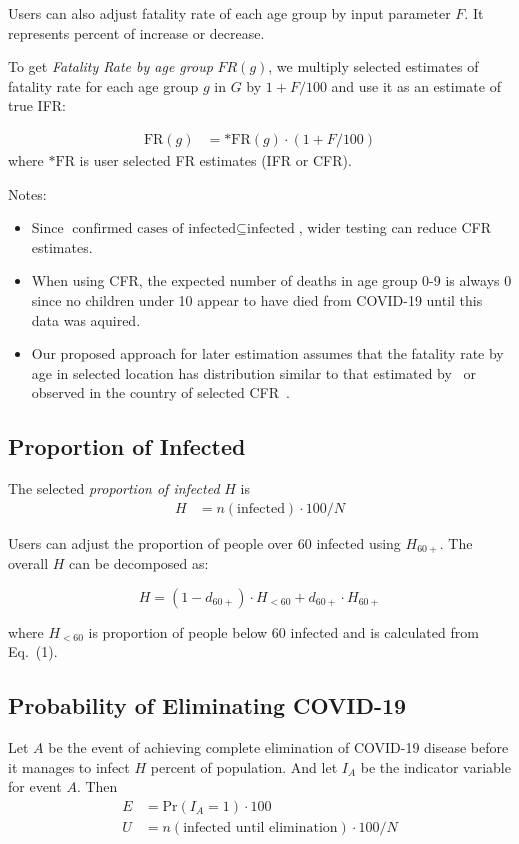 \documentclass[12pt]{article}
\begin{document}
Users can also adjust fatality rate of each age group by input parameter $F$. It represents percent of increase or decrease.

To get {\it Fatality Rate by age group} $FR(g)$, we multiply selected estimates of fatality rate for each age group $g$ in $G$ by $1 + F/100$ and use it as an estimate of true IFR:

\begin{align*}
\text{FR}(g) &=
   \text{*FR}(g) \cdot (1 + F/100)
\end{align*}
where $\text{*FR}$ is user selected FR estimates (IFR or CFR).

Notes:
\begin{itemize}
\item Since $\text{confirmed cases of infected} \subseteq \text{infected}$, wider testing can reduce CFR estimates.
\item When using CFR, the expected number of deaths in age group 0-9 is always 0 since no children under 10 appear to have died from COVID-19 until this data was aquired.
\item Our proposed approach for later estimation assumes that the fatality rate by age in selected location has distribution similar to that estimated by~\cite{imperial} or observed in the country of selected CFR~\cite{cfrs}.
\end{itemize}

\subsection*{Proportion of Infected}
The selected {\it proportion of infected} $H$ is
\begin{align*}
H &= n(\text{infected}) \cdot 100 / N
\end{align*}


Users can adjust the proportion of people over 60 infected using $H_{60+}$. The overall $H$ can be decomposed as:

\begin{equation*}
	H = (1 - d_{60+}) \cdot H_{<60} + d_{60+} \cdot H_{60+}
	\tag{1}
\end{equation*}

where $H_{<60}$ is proportion of people below 60 infected and is calculated from Eq.~(1).

\subsection*{Probability of Eliminating COVID-19}
Let $A$ be the event of achieving complete elimination of COVID-19 disease before it manages to infect $H$ percent of population. And let $I_{A}$ be the indicator variable for event $A$. Then
\begin{align*}
E &= \text{Pr}(I_{A} = 1) \cdot 100 \\
U &= n(\text{infected until elimination}) \cdot 100 / N
\end{align*}
\end{document}
